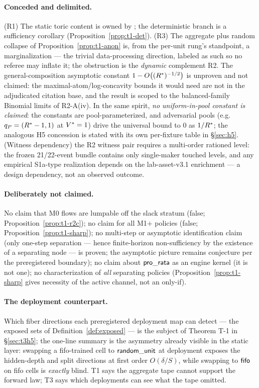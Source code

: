 \paragraph{Conceded and delimited.} (R1) The static toric content is owned
by \citep{diaconissturmfels1998, fibers2014}; the deterministic branch is a
sufficiency corollary (Proposition~\ref{prop:t1-det}). (R3) The aggregate
plus random collapse of Proposition~\ref{prop:t1-anon} is, from the per-unit
rung's standpoint, a marginalization --- the trivial data-processing
direction, labeled as such so no referee may inflate it; the obstruction is
the \emph{dynamic} complement R2. The general-composition asymptotic
constant $1 - O\bigl((R^{*})^{-1/2}\bigr)$ is unproven and not claimed: the
maximal-atom/log-concavity bounds it would need are not in the adjudicated
citation base, and the result is scoped to the balanced-family Binomial
limits of R2-A(iv). In the same spirit, \emph{no uniform-in-pool constant is
claimed}: the constants are pool-parameterized, and adversarial pools
(e.g.\ $q_{P} = (R^{*} - 1, 1)$ at $V^{*} = 1$) drive the universal bound to
$0$ as $1/R^{*}$; the analogous H5 concession is stated with its own
per-fixture table in \S\ref{sec:h5}. (Witness dependency) the R2 witness
pair requires a multi-order rationed level: the frozen 21/22-event bundle
contains only single-maker touched levels, and any empirical S1a-type
realization depends on the lab-asset-v3.1 enrichment --- a design
dependency, not an observed outcome.

\paragraph{Deliberately not claimed.} No claim that M0 flows are lumpable
off the slack stratum (false; Proposition~\ref{prop:t1-r2c}); no claim for
all M1$+$ policies (false; Proposition~\ref{prop:t1-sharp}); no multi-step
or asymptotic identification claim (only one-step separation --- hence
finite-horizon non-sufficiency by the existence of a separating node ---
is proven; the asymptotic picture remains conjecture per the preregistered
boundary); no claim about $\mathsf{pro\_rata}$ as an engine kernel (it is not one);
no characterization of \emph{all} separating policies
(Proposition~\ref{prop:t1-sharp} gives necessity of the active channel, not
an only-if).

\paragraph{The deployment counterpart.} Which fiber directions each
preregistered deployment map can detect --- the exposed sets of
Definition~\ref{def:exposed} --- is the subject of Theorem T-1 in
\S\ref{sec:t3h5}; the one-line summary is the asymmetry already visible in
the static layer: swapping a fifo-trained cell to $\mathsf{random\_unit}$ at deployment
exposes the hidden-depth and split directions at first order $O(\delta/S)$,
while swapping to $\mathsf{fifo}$ on fifo cells is \emph{exactly} blind. T1 says
the aggregate tape cannot support the forward law; T3 says which
deployments can see what the tape omitted.
